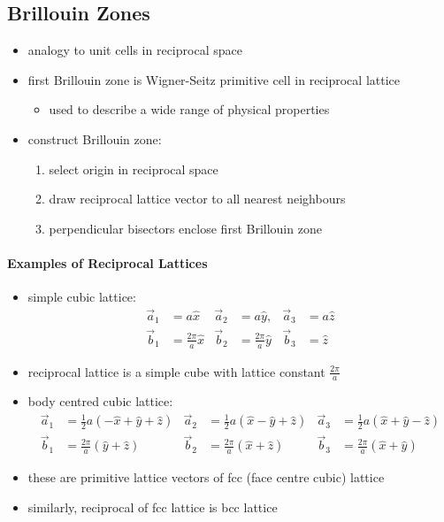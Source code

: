 \documentclass[a4paper,11pt,normalem]{article}
\begin{document}
\subsection{Brillouin Zones}

\begin{itemize}
    \item analogy to unit cells in reciprocal space
    \item first Brillouin zone is Wigner-Seitz primitive cell in reciprocal lattice
        \begin{itemize}
            \item used to describe a wide range of physical properties
        \end{itemize}
    \item construct Brillouin zone:
        \begin{enumerate}
            \item select origin in reciprocal space
            \item draw reciprocal lattice vector to all nearest neighbours
            \item perpendicular bisectors enclose first Brillouin zone
        \end{enumerate}
\end{itemize}

\paragraph{Examples of Reciprocal Lattices}

\begin{itemize}
    \item simple cubic lattice:
        \begin{align*}
            \vec{a}_1 &= a\hat{x} & \vec{a}_2 &= a\hat{y}, & \vec{a}_3 &= a\hat{z} \\
            \vec{b}_{1} &= \frac{2\pi}{a} \hat{x} & \vec{b}_2 &= \frac{2\pi}{a}\hat{y} & \vec{b}_3 &= \hat{z}
        \end{align*}
    \item reciprocal lattice is a simple cube with lattice constant \(\frac{2\pi}{a}\)
    \item body centred cubic lattice:
        \begin{align*}
            \vec{a}_1 &= \frac{1}{2}a(-\hat{x} + \hat{y} + \hat{z}) & \vec{a}_2 &= \frac{1}{2}a(\hat{x}-\hat{y}+\hat{z}) & \vec{a}_3 &= \frac{1}{2}a(\hat{x}+\hat{y}-\hat{z}) \\
            \vec{b}_1 &= \frac{2\pi}{a}(\hat{y} + \hat{z}) & \vec{b}_2 &= \frac{2\pi}{a}(\hat{x}+\hat{z}) & \vec{b}_3 &= \frac{2\pi}{a}(\hat{x}+\hat{y})
        \end{align*}
    \item these are primitive lattice vectors of fcc (face centre cubic) lattice
    \item similarly, reciprocal of fcc lattice is bcc lattice
\end{itemize}
\end{document}
